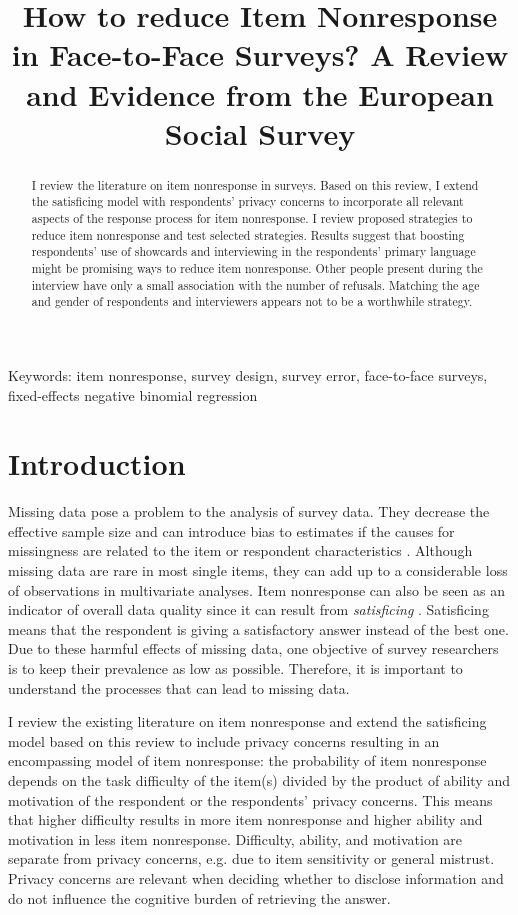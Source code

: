 \documentclass[a4paper,12pt]{article}
\title{How to reduce Item Nonresponse in Face-to-Face Surveys? A Review and Evidence from the European Social Survey}
\begin{document}
\maketitle

\begin{abstract}
I review the literature on item nonresponse in surveys. Based on this review, I extend the satisficing model with respondents' privacy concerns to incorporate all relevant aspects of the response process for item nonresponse. I review proposed strategies to reduce item nonresponse and test selected strategies. Results suggest that boosting respondents' use of showcards and interviewing in the respondents' primary language might be promising ways to reduce item nonresponse. Other people present during the interview have only a small association with the number of refusals. Matching the age and gender of respondents and interviewers appears not to be a worthwhile strategy.
\end{abstract}

Keywords: item nonresponse, survey design, survey error, face-to-face surveys, fixed-effects negative binomial regression

\section{Introduction}

Missing data pose a problem to the analysis of survey data. They decrease the effective sample size and can introduce bias to estimates if the causes for missingness are related to the item or respondent characteristics \citep{deleeuwPreventionTreatmentItem2003}. Although missing data are rare in most single items, they can add up to a considerable loss of observations in multivariate analyses. Item nonresponse can also be seen as an indicator of overall data quality since it can result from \textit{satisficing} \citep{krosnickResponseStrategiesCoping1991}. Satisficing means that the respondent is giving a satisfactory answer instead of the best one. Due to these harmful effects of missing data, one objective of survey researchers is to keep their prevalence as low as possible. Therefore, it is important to understand the processes that can lead to missing data.

I review the existing literature on item nonresponse and extend the satisficing model based on this review to include privacy concerns resulting in an encompassing model of item nonresponse: the probability of item nonresponse depends on the task difficulty of the item(s) divided by the product of ability and motivation of the respondent or the respondents' privacy concerns. This means that higher difficulty results in more item nonresponse and higher ability and motivation in less item nonresponse. Difficulty, ability, and motivation are separate from privacy concerns, e.g. due to item sensitivity or general mistrust. Privacy concerns are relevant when deciding whether to disclose information and do not influence the cognitive burden of retrieving the answer.
\end{document}
